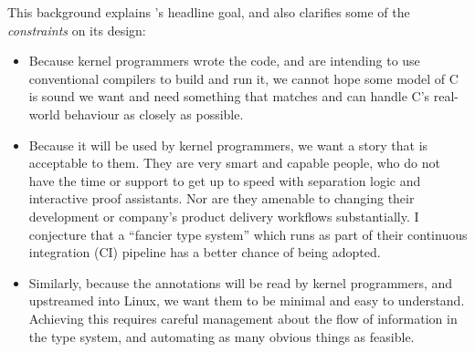 This background explains 's headline goal, and also
clarifies some of the \emph{constraints} on its design:
\begin{itemize}
    \item Because kernel programmers wrote the code, and are intending to use
        conventional compilers to build and run it, we cannot hope
        some \adhoc{} model of C is sound \textemdash{} we want and need
        something that matches and can handle C's real-world behaviour as
        closely as possible.
    \item Because it will be used by kernel programmers, we want a story that
        is acceptable to them. They are very smart and capable people, who do
        not have the time or support to get up to speed with separation logic
        and interactive proof assistants. Nor are they amenable to changing
        their development or company's product delivery workflows
        substantially. I conjecture that a ``fancier type system'' which runs
        as part of their continuous integration (CI) pipeline has a better
        chance of being adopted.
    \item Similarly, because the annotations will be read by kernel
        programmers, and upstreamed into Linux, we want them to be minimal and
        easy to understand. Achieving this requires careful management
        about the flow of information in the type system, and automating
        as many obvious things as feasible.
\end{itemize}

